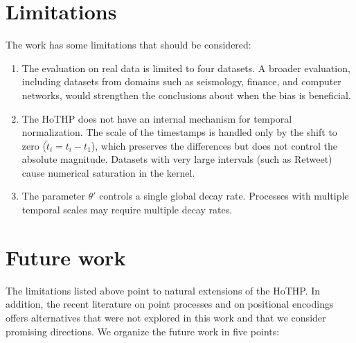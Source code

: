 \section{Limitations}

The work has some limitations that should be considered:
\begin{enumerate}
    \item The evaluation on real data is limited to four datasets. A broader evaluation, including datasets from domains such as seismology, finance, and computer networks, would strengthen the conclusions about when the bias is beneficial.

    \item The HoTHP does not have an internal mechanism for temporal normalization. The scale of the timestamps is handled only by the shift to zero ($\tilde{t}_i = t_i - t_1$), which preserves the differences but does not control the absolute magnitude. Datasets with very large intervals (such as Retweet) cause numerical saturation in the kernel.

    \item The parameter $\theta'$ controls a single global decay rate. Processes with multiple temporal scales may require multiple decay rates.
\end{enumerate}

\section{Future work}

The limitations listed above point to natural extensions of the HoTHP. In addition, the recent literature on point processes and on positional encodings offers alternatives that were not explored in this work and that we consider promising directions. We organize the future work in five points:

